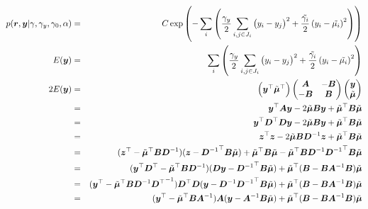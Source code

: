 \documentclass[platex, a4paper]{jsarticle}
\begin{document}
\begin{eqnarray}
  p( \bm{r}, \bm{y}| \gamma, \gamma_y, \gamma_0, \alpha)
    &=& C \exp  \left( - \sum_i \left( \dfrac {\gamma_y} {2} \sum_{i,j\in{J_i}} \left(y_i - y_j \right)^2
      + \dfrac {\tilde{\gamma_i}} {2} \left( y_{i} - \tilde {\mu_i} \right) ^{2} \right) \right)\\
  E(\bm{y})
    &=& \sum_i \left( \dfrac {\gamma_y} {2} \sum_{i,j\in{J_i}} \left(y_i - y_j \right)^2
      + \dfrac {\tilde{\gamma_i}} {2} \left( y_{i} - \tilde {\mu_i} \right) ^{2} \right)\\
  2E(\bm{y})
    &=& \begin{pmatrix} \bm{y} ^\top  \tilde{\bm{\mu}}^\top \end{pmatrix}
        \begin{pmatrix}
            \bm{A} & -\bm{B} \\
            -\bm{B} & \bm{B}
        \end{pmatrix}
        \begin{pmatrix}
          \bm{y}  \\
          \tilde{\bm{\mu}}
        \end{pmatrix} \\
    &=& \bm{y} ^\top \bm{A} \bm{y}  - 2 \tilde{\bm{\mu}} \bm{B} \bm{y}
        + \tilde{\bm{\mu}}^\top \bm{B} \tilde{\bm{\mu}} \\
    &=& \bm{y} ^\top \bm{D}^{\top} \bm{D} \bm{y}  - 2 \tilde{\bm{\mu}} \bm{B} \bm{y}
        + \tilde{\bm{\mu}}^\top \bm{B} \tilde{\bm{\mu}} \\
    &=& \bm{z}^{\top}\bm{z} - 2 \tilde{\bm{\mu}} \bm{B} \bm{D}^{-1}\bm{z}  + \tilde{\bm{\mu}}^\top \bm{B} \tilde{\bm{\mu}} \\
    &=& (\bm{z}^{\top} - \tilde{\bm{\mu}}^{\top}\bm{B} \bm{D}^{-1}) (\bm{z} - {\bm{D}^{-1}}^\top \bm{B}   \tilde{\bm{\mu}})
    + \tilde{\bm{\mu}}^\top \bm{B} \tilde{\bm{\mu}} - \tilde{\bm{\mu}}^{\top}\bm{B} \bm{D}^{-1}
    {\bm{D}^{-1}}^\top \bm{B} \tilde{\bm{\mu}} \\
    &=& (\bm{y} ^\top \bm{D}^{\top} - \tilde{\bm{\mu}}^{\top}\bm{B} \bm{D}^{-1})(\bm{D}\bm{y}  - {\bm{D}^{-1}}^\top \bm{B} \tilde{\bm{\mu}}) + \tilde{\bm{\mu}}^\top (\bm{B} - \bm{B} \bm{A}^{-1} \bm{B} ) \tilde{\bm{\mu}} \\
    &=&  (\bm{y} ^{\top} - \tilde{\bm{\mu}}^{\top}\bm{B} \bm{D}^{-1} {\bm{D}^{\top}}^{-1}) \bm{D}^{\top} \bm{D} (\bm{y}  - \bm{D}^{-1}{\bm{D}^{-1}}^\top \bm{B} \tilde{\bm{\mu}}) + \tilde{\bm{\mu}}^\top (\bm{B} - \bm{B} \bm{A}^{-1} \bm{B} ) \tilde{\bm{\mu}} \\
    &=& (\bm{y} ^{\top} - \tilde{\bm{\mu}}^{\top}\bm{B} \bm{A}^{-1}) \bm{A} (\bm{y}  - \bm{A}^{-1} \bm{B} \tilde{\bm{\mu}})
    + \tilde{\bm{\mu}}^\top (\bm{B} - \bm{B} \bm{A}^{-1} \bm{B} ) \tilde{\bm{\mu}}
\end{eqnarray}
\end{document}
